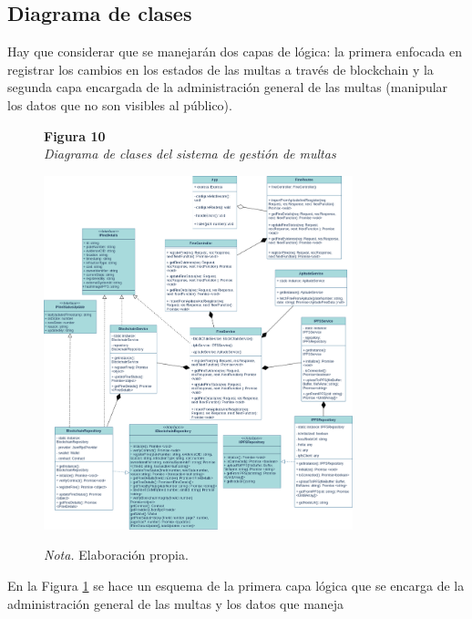  \subsection{ Diagrama de clases }
Hay que considerar que se manejarán dos capas de lógica: la primera enfocada en registrar los cambios en los estados de las multas a través de blockchain y la segunda capa encargada de la administración general de las multas (manipular los datos que no son visibles al público). 
 \begin{figure}[htbp]
    \begin{flushleft}
        \textbf{Figura 10}\\[2em]
        \textit{Diagrama de clases del sistema de gestión de multas}
    \end{flushleft}
    \vspace{1em}
    \centering
    \includegraphics[width=0.8\textwidth]{Images/uml.png}
    \vspace{2em}
    \begin{flushleft}
        \textit{Nota.} Elaboración propia.
    \end{flushleft}
    \label{fig:diagrama_clases}
\end{figure}
En la Figura \ref{fig:diagrama_clases} se hace un esquema de la primera capa lógica que se encarga de la administración general de las multas y los datos que maneja
